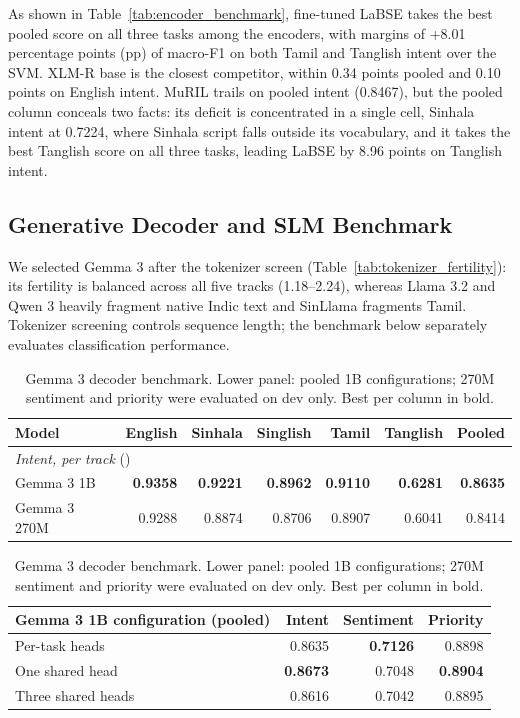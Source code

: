 As shown in Table~\ref{tab:encoder_benchmark}, fine-tuned LaBSE takes the best pooled score on all three tasks among the encoders, with margins of +8.01 percentage points (pp) of macro-F1 on both Tamil and Tanglish intent over the SVM. XLM-R base is the closest competitor, within 0.34 points pooled and 0.10 points on English intent. MuRIL trails on pooled intent (0.8467), but the pooled column conceals two facts: its deficit is concentrated in a single cell, Sinhala intent at 0.7224, where Sinhala script falls outside its vocabulary, and it takes the best Tanglish score on all three tasks, leading LaBSE by 8.96 points on Tanglish intent. 

\subsection{Generative Decoder and SLM Benchmark}

We selected Gemma 3 after the tokenizer screen (Table~\ref{tab:tokenizer_fertility}): its fertility is balanced across all five tracks (1.18--2.24), whereas Llama 3.2 and Qwen 3 heavily fragment native Indic text and SinLlama fragments Tamil. Tokenizer screening controls sequence length; the benchmark below separately evaluates classification performance.

\begin{table}[!htbp]
\caption{Gemma 3 decoder benchmark. Lower panel: pooled 1B configurations;
270M sentiment and priority were evaluated on dev only. Best per column in bold.}
\label{tab:decoder_benchmark}
\centering
\scriptsize
\setlength{\tabcolsep}{3.2pt}
\begin{tabular}{@{}lrrrrrr@{}}
\toprule
Model & English & Sinhala & Singlish & Tamil & Tanglish & Pooled \\
\midrule
\multicolumn{7}{l}{\textit{Intent, per track} (\macrof{})} \\
Gemma 3 1B   & \textbf{0.9358} & \textbf{0.9221} & \textbf{0.8962} & \textbf{0.9110} & \textbf{0.6281} & \textbf{0.8635} \\
Gemma 3 270M & 0.9288 & 0.8874 & 0.8706 & 0.8907 & 0.6041 & 0.8414 \\
\bottomrule
\end{tabular}

\vspace{4pt}
\begin{tabular}{@{}lrrr@{}}
\toprule
Gemma 3 1B configuration (pooled) & Intent & Sentiment & Priority \\
\midrule
Per-task heads    & 0.8635 & \textbf{0.7126} & 0.8898 \\
One shared head   & \textbf{0.8673} & 0.7048 & \textbf{0.8904} \\
Three shared heads & 0.8616 & 0.7042 & 0.8895 \\
\bottomrule
\end{tabular}
\end{table}

